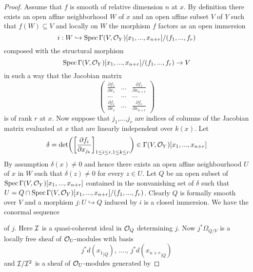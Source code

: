 \begin{proof}
Assume that $f$ is smooth of relative dimension $n$ at $x$. By definition there exists an open affine neighborhood $W$ of $x$ and an open affine subset $V$ of $Y$ such that $f(W)\subseteq V$ and locally on $W$ the morphism $f$ factors as an open immersion
$$i:W \hookrightarrow \mathrm{Spec}\, \Gamma(V,{\mathcal O}_Y)[x_1,...,x_{n+r}]/(f_1,...,f_r)$$
composed with the structural morphism
$$\mathrm{Spec}\, \Gamma(V,{\mathcal O}_Y)[x_1,...,x_{n+r}]/(f_1,...,f_r)\rightarrow V$$
in such a way that the Jacobian matrix
$$\begin{pmatrix}
\frac{\partial f_1}{\partial x_1} & ... & \frac{\partial f_1}{\partial x_{n+r}} \\
... &...  &...  \\
\frac{\partial f_r}{\partial x_{1}} &...  & \frac{\partial f_r}{\partial x_{n+r}}\end{pmatrix}$$
is of rank $r$ at $x$. Now suppose that $j_1$,...,$j_r$ are indices of columns of the Jacobian matrix evaluated at $x$ that are linearly independent over $k(x)$. Let
$$\delta=\mathrm{det}\bigg(\bigg[\frac{\partial f_i}{\partial x_{j_k}}\bigg]_{1\leq i\leq r,1\leq k\leq r}\bigg)\in \Gamma(V,{\mathcal O}_Y)[x_1,...,x_{n+r}]$$
By assumption $\delta (x)\neq 0$ and hence there exists an open affine neighbourhood $U$ of $x$ in $W$ such that $\delta(z)\neq 0$ for every $z\in U$. Let $Q$ be an open subset of $\mathrm{Spec}\, \Gamma(V,{\mathcal O}_Y)[x_1,...,x_{n+r}]$ contained in the nonvanishing set of $\delta$ such that $U = Q \cap \mathrm{Spec}\, \Gamma(V,{\mathcal O}_Y)[x_1,...,x_{n+r}]/(f_1,...,f_r)$. Clearly $Q$ is formally smooth over $V$ and a morphism $j:U\hookrightarrow Q$ induced by $i$ is a closed immersion. We have the conormal sequence
\begin{center}
\end{center}
of $j$. Here ${\mathcal I}$ is a quasi-coherent ideal in ${\mathcal O}_Q$ determining $j$. Now $j^*\Omega_{Q/V}$ is a locally free sheaf of ${\mathcal O}_U$-modules with basis
$$j^*d({x_1}_{\mid Q}),\,....,\,j^*d({x_{n+r}}_{\mid Q})$$
and ${\mathcal I}/{\mathcal I}^2$ is a sheaf of ${\mathcal O}_U$-modules generated by

\end{proof}
